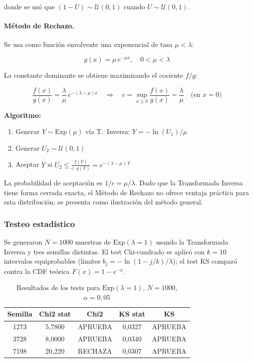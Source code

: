 donde se usó que $(1-U) \sim \mathcal{U}(0,1)$ cuando $U \sim \mathcal{U}(0,1)$.

\paragraph{Método de Rechazo.}
Se usa como función envolvente una exponencial de tasa $\mu < \lambda$:

\begin{equation}
g(x) = \mu \, e^{-\mu x}, \quad 0 < \mu < \lambda
\end{equation}

La constante dominante se obtiene maximizando el cociente $f/g$:

\begin{equation}
\frac{f(x)}{g(x)} = \frac{\lambda}{\mu} \, e^{-(\lambda - \mu)x}
\quad \Longrightarrow \quad
c = \sup_{x \geq 0} \frac{f(x)}{g(x)} = \frac{\lambda}{\mu}
\quad \text{(en } x = 0\text{)}
\end{equation}

\textbf{Algoritmo:}
\begin{enumerate}
    \item Generar $Y \sim \text{Exp}(\mu)$ vía T.\ Inversa: $Y = -\ln(U_1)/\mu$
    \item Generar $U_2 \sim \mathcal{U}(0,1)$
    \item Aceptar $Y$ si $\displaystyle U_2 \leq \frac{f(Y)}{c \cdot g(Y)} = e^{-(\lambda - \mu)\,Y}$
\end{enumerate}

La probabilidad de aceptación es $1/c = \mu/\lambda$. Dado que la Transformada Inversa
tiene forma cerrada exacta, el Método de Rechazo no ofrece ventaja práctica para esta
distribución; se presenta como ilustración del método general.

\subsubsection{Testeo estadístico}

Se generaron $N = 1000$ muestras de $\text{Exp}(\lambda = 1)$ usando la Transformada Inversa
y tres semillas distintas. El test Chi-cuadrado se aplicó con $k = 10$ intervalos
equiprobables (límites $b_j = -\ln(1 - j/k)/\lambda$); el test KS comparó contra la CDF
teórica $F(x) = 1 - e^{-x}$.

\begin{table}[h!]
\centering
\begin{tabular}{|c|c|c|c|c|}
\hline
\textbf{Semilla} & \textbf{Chi2 stat} & \textbf{Chi2} & \textbf{KS stat} & \textbf{KS} \\
\hline
1273 & 5{,}7800 & APRUEBA & 0{,}0327 & APRUEBA \\
3728 & 8{,}0000 & APRUEBA & 0{,}0340 & APRUEBA \\
7198 & 20{,}220 & RECHAZA & 0{,}0307 & APRUEBA \\
\hline
\end{tabular}
\caption{Resultados de los tests para $\text{Exp}(\lambda=1)$, $N=1000$, $\alpha=0{,}05$}
\end{table}

